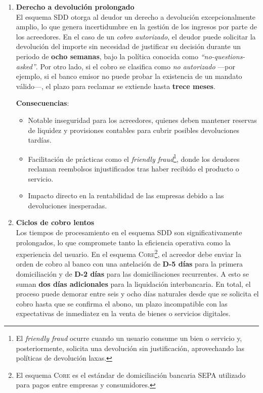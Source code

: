 \begin{enumerate}[label=\textbf{\arabic*.}, leftmargin=0.75cm]
  \item \textbf{Derecho a devolución prolongado}\\
        El esquema SDD otorga al deudor un derecho a devolución excepcionalmente amplio, lo que genera incertidumbre en la gestión de los ingresos por parte de los acreedores. En el caso de un \emph{cobro autorizado}, el deudor puede solicitar la devolución del importe sin necesidad de justificar su decisión durante un periodo de \textbf{ocho semanas}, bajo la política conocida como \emph{“no-questions-asked”}. Por otro lado, si el cobro se clasifica como \emph{no autorizado} —por ejemplo, si el banco emisor no puede probar la existencia de un mandato válido—, el plazo para reclamar se extiende hasta \textbf{trece meses}.
        
        \textbf{Consecuencias}:
        \begin{itemize}
          \item Notable inseguridad para los acreedores, quienes deben mantener reservas de liquidez y provisiones contables para cubrir posibles devoluciones tardías.
          \item Facilitación de prácticas como el \emph{friendly fraud}\footnote{El \emph{friendly fraud} ocurre cuando un usuario consume un bien o servicio y, posteriormente, solicita una devolución sin justificación, aprovechando las políticas de devolución laxas.}, donde los deudores reclaman reembolsos injustificados tras haber recibido el producto o servicio.
          \item Impacto directo en la rentabilidad de las empresas debido a las devoluciones inesperadas.
        \end{itemize}

  \item \textbf{Ciclos de cobro lentos}\\
        Los tiempos de procesamiento en el esquema SDD son significativamente prolongados, lo que compromete tanto la eficiencia operativa como la experiencia del usuario. En el esquema \textsc{Core}\footnote{El esquema \textsc{Core} es el estándar de domiciliación bancaria SEPA utilizado para pagos entre empresas y consumidores.}, el acreedor debe enviar la orden de cobro al banco con una antelación de \textbf{D-5 días} para la primera domiciliación y de \textbf{D-2 días} para las domiciliaciones recurrentes. A esto se suman \textbf{dos días adicionales} para la liquidación interbancaria. En total, el proceso puede demorar entre seis y ocho días naturales desde que se solicita el cobro hasta que se confirma el abono, un plazo incompatible con las expectativas de inmediatez en la venta de bienes o servicios digitales.
        

\end{enumerate}
